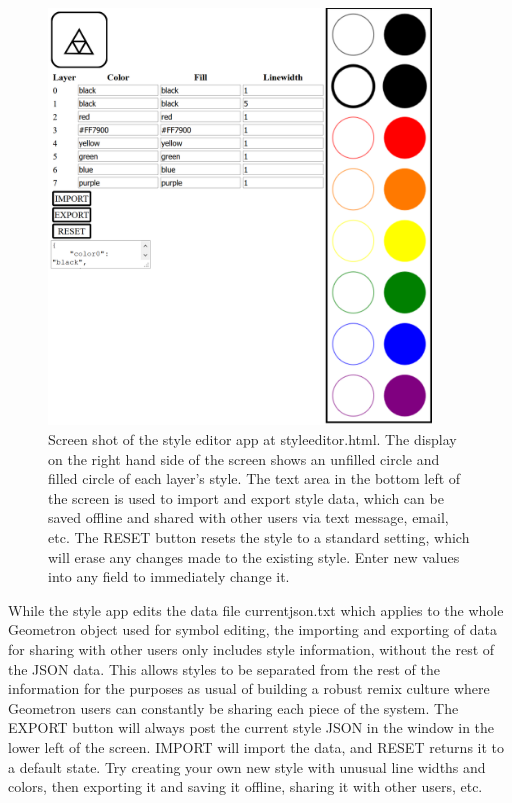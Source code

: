 \begin{figure}
	\centering
	\includegraphics[width=4in]{figures/web2d/styleeditor.png}
	\caption[styleeditor]
	{Screen shot of the style editor app at styleeditor.html.  The display on the right hand side of the screen shows an unfilled circle and filled circle of each layer's style.  The text area in the bottom left of the screen is used to import and export style data, which can be saved offline and shared with other users via text message, email, etc.  The RESET button resets the style to a standard setting, which will erase any changes made to the existing style. Enter new values into any field to immediately change it.}
\end{figure}

While the style app edits the data file currentjson.txt which applies to the whole Geometron object used for symbol editing, the importing and exporting of data for sharing with other users only includes style information, without the rest of the JSON data.  This allows styles to be separated from the rest of the information for the purposes as usual of building a robust remix culture where Geometron users can constantly be sharing each piece of the system.  The EXPORT button will always post the current style JSON in the window in the lower left of the screen.  IMPORT will import the data, and RESET returns it to a default state.  Try creating your own new style with unusual line widths and colors, then exporting it and saving it offline, sharing it with other users, etc.  

